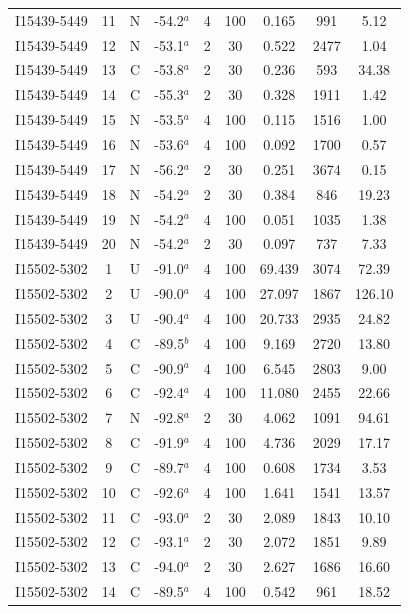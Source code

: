 \begin{table}
\begin{tabular}{ccccccccc}
I15439-5449 & 11 & N & -54.2$^{a}$ & 4 & 100 & 0.165 & 991 & 5.12 \\
I15439-5449 & 12 & N & -53.1$^{a}$ & 2 & 30 & 0.522 & 2477 & 1.04 \\
I15439-5449 & 13 & C & -53.8$^{a}$ & 2 & 30 & 0.236 & 593 & 34.38 \\
I15439-5449 & 14 & C & -55.3$^{a}$ & 2 & 30 & 0.328 & 1911 & 1.42 \\
I15439-5449 & 15 & N & -53.5$^{a}$ & 4 & 100 & 0.115 & 1516 & 1.00 \\
I15439-5449 & 16 & N & -53.6$^{a}$ & 4 & 100 & 0.092 & 1700 & 0.57 \\
I15439-5449 & 17 & N & -56.2$^{a}$ & 2 & 30 & 0.251 & 3674 & 0.15 \\
I15439-5449 & 18 & N & -54.2$^{a}$ & 2 & 30 & 0.384 & 846 & 19.23 \\
I15439-5449 & 19 & N & -54.2$^{a}$ & 4 & 100 & 0.051 & 1035 & 1.38 \\
I15439-5449 & 20 & N & -54.2$^{a}$ & 2 & 30 & 0.097 & 737 & 7.33 \\
I15502-5302 & 1 & U & -91.0$^{a}$ & 4 & 100 & 69.439 & 3074 & 72.39 \\
I15502-5302 & 2 & U & -90.0$^{a}$ & 4 & 100 & 27.097 & 1867 & 126.10 \\
I15502-5302 & 3 & U & -90.4$^{a}$ & 4 & 100 & 20.733 & 2935 & 24.82 \\
I15502-5302 & 4 & C & -89.5$^{b}$ & 4 & 100 & 9.169 & 2720 & 13.80 \\
I15502-5302 & 5 & C & -90.9$^{a}$ & 4 & 100 & 6.545 & 2803 & 9.00 \\
I15502-5302 & 6 & C & -92.4$^{a}$ & 4 & 100 & 11.080 & 2455 & 22.66 \\
I15502-5302 & 7 & N & -92.8$^{a}$ & 2 & 30 & 4.062 & 1091 & 94.61 \\
I15502-5302 & 8 & C & -91.9$^{a}$ & 4 & 100 & 4.736 & 2029 & 17.17 \\
I15502-5302 & 9 & C & -89.7$^{a}$ & 4 & 100 & 0.608 & 1734 & 3.53 \\
I15502-5302 & 10 & C & -92.6$^{a}$ & 4 & 100 & 1.641 & 1541 & 13.57 \\
I15502-5302 & 11 & C & -93.0$^{a}$ & 2 & 30 & 2.089 & 1843 & 10.10 \\
I15502-5302 & 12 & C & -93.1$^{a}$ & 2 & 30 & 2.072 & 1851 & 9.89 \\
I15502-5302 & 13 & C & -94.0$^{a}$ & 2 & 30 & 2.627 & 1686 & 16.60 \\
I15502-5302 & 14 & C & -89.5$^{a}$ & 4 & 100 & 0.542 & 961 & 18.52 \\

\end{tabular}
\end{table}
